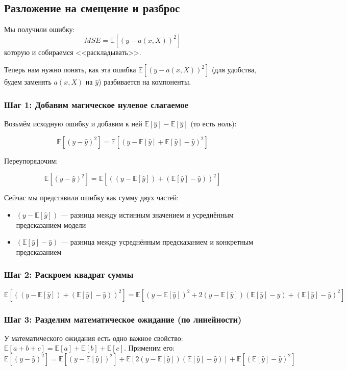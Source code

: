 \subsection*{Разложение на смещение и разброс}
Мы получили ошибку:
\[
MSE = \mathbb{E}[(y - a(x,X))^2]
\]
которую и собираемся <<раскладывать>>.

Теперь нам нужно понять, как эта ошибка $\mathbb{E}[(y - a(x,X))^2]$ (для удобства, будем заменять $a(x,X)$ на $\hat{y}$) разбивается на компоненты.
\subsubsection*{Шаг 1: Добавим магическое нулевое слагаемое}

Возьмём исходную ошибку и добавим к ней $\mathbb{E}[\hat{y}] - \mathbb{E}[\hat{y}]$ (то есть ноль):

\[
\mathbb{E}[(y - \hat{y})^2] = \mathbb{E}[(y - \mathbb{E}[\hat{y}] + \mathbb{E}[\hat{y}] - \hat{y})^2]
\]

Переупорядочим:

\[
\mathbb{E}[(y - \hat{y})^2] = \mathbb{E}[((y - \mathbb{E}[\hat{y}]) + (\mathbb{E}[\hat{y}] - \hat{y}))^2]
\]

Сейчас мы представили ошибку как сумму двух частей:
\begin{itemize}
    \item $(y - \mathbb{E}[\hat{y}])$ --- разница между истинным значением и усреднённым предсказанием модели
    \item $(\mathbb{E}[\hat{y}] - \hat{y})$ --- разница между усреднённым предсказанием и конкретным предсказанием
\end{itemize}

\subsubsection*{Шаг 2: Раскроем квадрат суммы}
\[
\mathbb{E}[((y - \mathbb{E}[\hat{y}]) + (\mathbb{E}[\hat{y}] - \hat{y}))^2] = \mathbb{E}[(y - \mathbb{E}[\hat{y}])^2 + 2(y - \mathbb{E}[\hat{y}])(\mathbb{E}[\hat{y}] - \hat{y}) + (\mathbb{E}[\hat{y}] - \hat{y})^2]
\]

\subsubsection*{Шаг 3: Разделим математическое ожидание (по линейности)}

У математического ожидания есть одно важное свойство: $\mathbb{E}[a + b + c] = \mathbb{E}[a] + \mathbb{E}[b] + \mathbb{E}[c]$. Применим его:
\[
\mathbb{E}[(y - \hat{y})^2] = \mathbb{E}[(y - \mathbb{E}[\hat{y}])^2] + \mathbb{E}[2(y - \mathbb{E}[\hat{y}])(\mathbb{E}[\hat{y}] - \hat{y})] + \mathbb{E}[(\mathbb{E}[\hat{y}] - \hat{y})^2]
\]


